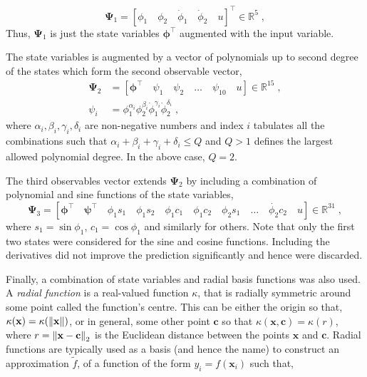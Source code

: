 \begin{equation}
    \label{eq: obs1}
\mathbf{\Psi}_1 = [\phi_1 \quad \phi_2 \quad \dot{\phi}_1\quad \dot{\phi}_2 \quad u]^\top \in \mathbb{R}^5 \;,
\end{equation}
Thus, $\mathbf{\Psi}_1$ is just the state variables $\boldsymbol{\phi}^\top$ augmented with the input variable. \par
The state variables is augmented by a vector of polynomials up to second degree of the states which form the second observable vector,
\begin{align}
    \mathbf{\Psi}_2 &= [\boldsymbol{\phi}^\top \quad \psi_1\quad \psi_2 \quad \dots \quad \psi_{10} \quad u]  \in \mathbb{R}^{15}\;,\\
    \psi_i &= \phi_1^{\alpha_i}\phi_2^{\beta_i}\dot{\phi}_1^{\gamma_i}\dot{\phi}_2^{\delta_i} \;,
\end{align}
where $\alpha_i,\beta_i,\gamma_i,\delta_i$ are non-negative numbers and index $i$ tabulates all the combinations such that $\alpha_i+\beta_i+\gamma_i+\delta_i \leq Q$ and $Q>1$ defines the largest allowed polynomial degree. In the above case, $Q = 2.$\par
The third observables vector extends $\mathbf{\Psi}_2$ by including a combination of polynomial and sine functions of the state variables,
\begin{equation}
    \mathbf{\Psi}_3 = [\boldsymbol{\phi}^\top \quad \boldsymbol{\psi}^\top \quad \phi_1s_1 \quad \phi_1s_2 \quad \phi_1c_1 \quad \phi_1c_2 \quad \phi_2s_1 \quad \dots \quad \dot{\phi_2}c_2 \quad u] \in \mathbb{R}^{31}\;,
\end{equation}
where $s_1 = \sin{\phi_1}$, $c_1 = \cos{\phi_1}$ and similarly for others. Note that only the first two states were considered for the sine and cosine functions. Including the derivatives did not improve the prediction significantly and hence were discarded.\par
Finally, a combination of state variables and radial basis functions was also used. A \textit{radial function} is a real-valued function $\kappa$, that is radially symmetric around some point called the function's centre. This can be either the origin so that, $\kappa(\mathbf{x}) = \kappa(\left\lVert\mathbf{x}\right\rVert)$, or in general, some other point $\mathbf{c}$ so that $\kappa(\mathbf{x,c}) = \kappa(r)$, where $ r = \left\lVert\mathbf{x-c}\right\rVert_2$ is the Euclidean distance between the points $\mathbf{x}$ and $\mathbf{c}$. Radial functions are typically used as a basis (and hence the name) to construct an approximation $\tilde{f}$, of a function of the form $y_i = f(\mathbf{x}_i)$ such that,
